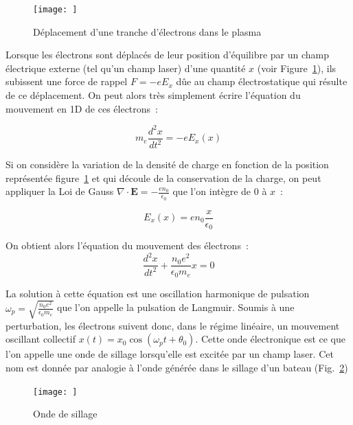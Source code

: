\documentclass[a4paper]{book}
\begin{document}
\begin{figure}[!htbp]
\begin{center}
\texttt{[image: ]}
\end{center}
\caption{Déplacement d'une tranche d'électrons dans le plasma}
\label{fig:osc_plas}
\end{figure}

Lorsque les électrons sont déplacés de leur position d'équilibre par un champ électrique externe (tel qu'un champ laser) d'une quantité $x$ (voir Figure~\ref{fig:osc_plas}), ils subissent une force de rappel $F=-e E_x$ dûe au champ électrostatique qui résulte de ce déplacement. On peut alors très simplement écrire l'équation du mouvement en 1D de ces électrons~: 

\begin{equation}
    m_e\frac{d^2 x}{dt^2}=-eE_x(x)
\end{equation}

Si on considère la variation de la densité de charge en fonction de la position représentée figure~\ref{fig:osc_plas} et qui découle de la conservation de la charge, on peut appliquer la Loi de Gauss $\nabla\cdot\textbf{E}=-\frac{e n_0}{\epsilon_0}$ que l'on intègre de 0 à $x$~: 

\begin{equation}
    E_x(x) = en_0\frac{x}{\epsilon_0}
    \label{eq:chp_E}
\end{equation}

On obtient alors l'équation du mouvement des électrons~:
\begin{equation}
    \frac{d^2x}{dt^2}+\frac{n_0e^2}{\epsilon_0 m_e} x =0
\end{equation}

La solution à cette équation est une oscillation harmonique de pulsation $\omega_p = \sqrt{\frac{n_0 e^2}{\epsilon_0 m_e}}$ que l'on appelle la pulsation de Langmuir. 
Soumis à une perturbation, les électrons suivent donc, dans le régime linéaire, un mouvement oscillant collectif $x(t) = x_0\cos(\omega_p t +\theta_0)$. 
Cette onde électronique est ce que l'on appelle une onde de sillage lorsqu'elle est excitée par un champ laser. Cet nom est donnée par analogie à l'onde générée dans le sillage d'un bateau (Fig.~\ref{fig:sillage})

\begin{figure}[!htbp]
\begin{center}
\texttt{[image: ]}
\end{center}
\caption{Onde de sillage}
\label{fig:sillage}
\end{figure}
\end{document}
